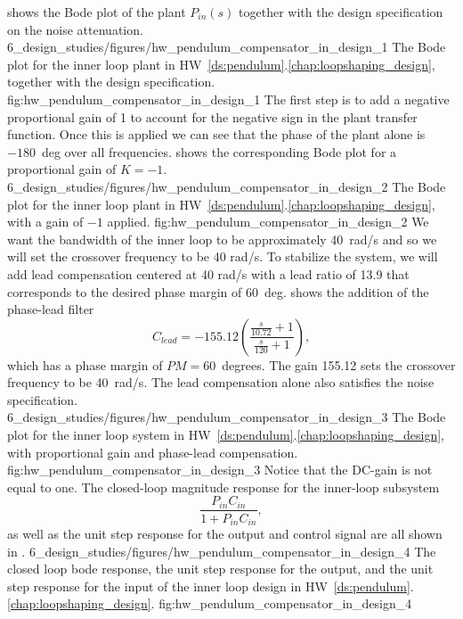  shows the Bode plot of the plant $P_{in}(s)$ together with the design specification on the noise attenuation.
%
	{6_design_studies/figures/hw_pendulum_compensator_in_design_1}
	{The Bode plot for the inner loop plant in HW~\ref{ds:pendulum}.\ref{chap:loopshaping_design}, together with the design specification.}
	{fig:hw_pendulum_compensator_in_design_1}
The first step is to add a negative proportional gain of 1 to account for the negative sign in the plant transfer function. Once this is applied we can see that the phase of the plant alone is $-180$~deg over all frequencies. %
 shows the corresponding Bode plot for a proportional gain of $K=-1$.
	{6_design_studies/figures/hw_pendulum_compensator_in_design_2}
	{The Bode plot for the inner loop plant in HW~\ref{ds:pendulum}.\ref{chap:loopshaping_design}, with a gain of $-1$ applied.}
	{fig:hw_pendulum_compensator_in_design_2}
We want the bandwidth of the inner loop to be approximately 40~rad/s and so we will set the crossover frequency to be 40 rad/s. To stabilize the system, we will add lead compensation centered at 40 rad/s with a lead ratio of 13.9 that corresponds to the desired phase margin of 60~deg.   shows the addition of the phase-lead filter
\[
C_{lead} = -155.12\left( \frac{\frac{s}{10.72}+1}{\frac{s}{120}+1} \right),
\]
which has a phase margin of $PM=60$~degrees. The gain 155.12 sets the crossover frequency to be 40~rad/s. The lead compensation alone also satisfies the noise specification.
	{6_design_studies/figures/hw_pendulum_compensator_in_design_3}
	{The Bode plot for the inner loop system in HW~\ref{ds:pendulum}.\ref{chap:loopshaping_design}, with proportional gain and phase-lead compensation.}
	{fig:hw_pendulum_compensator_in_design_3}
Notice that the DC-gain is not equal to one.
The closed-loop magnitude response for the inner-loop subsystem
\[
\frac{P_{in}C_{in}}{1+P_{in}C_{in}},
\] 
as well as the unit step response for the output and control signal are all shown in .
	{6_design_studies/figures/hw_pendulum_compensator_in_design_4}
	{The closed loop bode response, the unit step response for the output, and the unit step response for the input of the inner loop design in HW~\ref{ds:pendulum}.\ref{chap:loopshaping_design}.}
	{fig:hw_pendulum_compensator_in_design_4}

